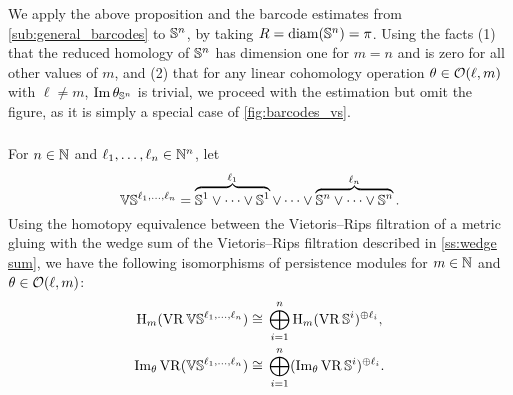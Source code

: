 \subsubsection{}

\label{subsub:barcode_Sn}

We apply the above proposition  and the barcode estimates from \cref{sub:general_barcodes} to \(\mathbb{S}^n\), by taking \(R = \operatorname{diam}(\mathbb{S}^n) = \pi\).
Using the facts (1) that the reduced homology of \(\mathbb{S}^n\) has dimension one for \(m = n\) and is zero for all other values of \(m\), and (2) that for any linear cohomology operation \(\theta \in \mathcal{O}(\ell, m)\) with \(\ell \neq m\), \(\operatorname{Im} \theta_{\mathbb{S}^n}\) is trivial, we proceed with the estimation but omit the figure, as it is simply a special case of \cref{fig:barcodes_vs}.



% 		

\subsubsection{}

For $n \in \mathbb{N}$ and $\ell_1, \dots, \ell_n \in \mathbb{N}^n$, let
\[
\mathbb{V}\mathbb{S}^{\ell_1,\dots,\ell_n} =
\overbrace{\mathbb{S}^1\vee\dots\vee\mathbb{S}^1}^{\ell_1} \vee\dots\vee \overbrace{\mathbb{S}^n\vee\dots\vee\mathbb{S}^n}^{\ell_n}.
\]
Using the homotopy equivalence between the Vietoris--Rips filtration of a metric gluing with the wedge sum of the Vietoris--Rips filtration described in \cref{ss:wedge sum}, we have the following isomorphisms of persistence modules for \(m \in \mathbb{N}\) and \(\theta \in \mathcal{O}(\ell,m)\):
\[
\begin{split}
	\mathrm{H}_m (\operatorname{VR}\mathbb{V}\mathbb{S}^{\ell_1,\dots,\ell_n}) &\cong \, \bigoplus_{i=1}^n \mathrm{H}_m (\operatorname{VR}\mathbb{S}^i)^{\oplus \ell_i}, \\
	\operatorname{Im}_\theta \operatorname{VR}(\mathbb{V}\mathbb{S}^{\ell_1,\dots,\ell_n}) &\cong \, \bigoplus_{i=1}^n (\operatorname{Im}_\theta \operatorname{VR}\mathbb{S}^i)^{\oplus \ell_i}.
\end{split}
\]


